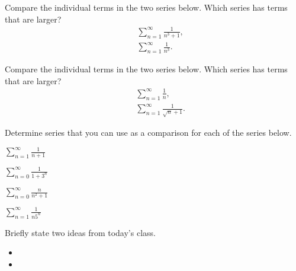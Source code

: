 
\begin{problem}
\item Compare the individual terms in the two series below. Which
  series has terms that are larger?
  \begin{eqnarray*}
    & & \sum^\infty_{n=1} \frac{1}{n^3+1}, \\
    & & \sum^\infty_{n=1} \frac{1}{n^3}.
  \end{eqnarray*}
  \vfill
\item Compare the individual terms in the two series below. Which
  series has terms that are larger?
  \begin{eqnarray*}
    & & \sum^\infty_{n=1} \frac{1}{n}, \\
    & & \sum^\infty_{n=1} \frac{1}{\sqrt{n}+1}.
  \end{eqnarray*}
  \vfill
\end{problem}


\begin{problem}
\item Determine series that you can use as a comparison for each of
  the series below.
  \begin{subproblem}
    \item $\sum_{n=1}^\infty \frac{1}{n+1}$
      \vfill
    \item $\sum_{n=0}^\infty \frac{1}{1+3^n}$
      \vfill
    \item $\sum_{n=0}^\infty \frac{n}{n^2+1} $
      \vfill
    \item $\sum_{n=1}^\infty \frac{1}{n5^n}$
      \vfill
  \end{subproblem}
\end{problem}


\postClass

\begin{problem}
\item Briefly state two ideas from today's class.
  \begin{itemize}
  \item 
  \item 
  \end{itemize}
\item 
  \begin{subproblem}
    \item
  \end{subproblem}
\end{problem}


